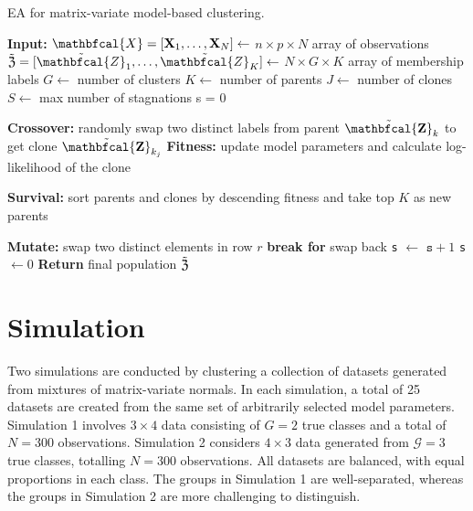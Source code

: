 \documentclass[12pt, centerh1]{article}
\begin{document}
\begin{algorithm}[h!]
\caption{EA for matrix-variate model-based clustering.}
\begin{algorithmic}[1]
	\Statex \textbf{Input:}
     		\Statex $ {\mathbfcal{X}} = [{\bf X}_1, \dots, {\bf X}_N ]\gets$ $n \times p \times N$ array of observations
		\Statex $ \tilde{ {\bf \mathfrak{Z} }} = [\tilde{ {\mathbfcal{Z}}}_{1}, \dots, \tilde{ {\mathbfcal{Z}}}_{K}]  \gets$ $N \times G \times K$ array of membership labels 
		 \Statex $G \gets$ number of clusters
   		 \Statex $K \gets$ number of parents
    		 \Statex $J \gets$ number of clones
    		 \Statex $S \gets$ max number of stagnations
\State s = 0

	 
		        \State \textbf{Crossover:} randomly swap two distinct labels from parent $\tilde{ {\bf \mathbfcal{Z}}}_{k}$ to get clone $\tilde{{\bf  \mathbfcal{Z}}}_{k_j}$
       			 \State \textbf{Fitness:} update model parameters and calculate log-likelihood of the clone 
		\EndFor
	\EndFor
	
	\State \textbf{Survival:} sort parents and clones by descending fitness and take top $K$ as new parents 
		
	 
        			\State \textbf{Mutate:} swap two distinct elements in row $r$ 
        				\State \textbf{break for}
     			\Else
     				\State swap back 
   			 \EndIf
        		\EndFor
        \EndFor  
        \State \texttt{s} $\gets$  $\texttt{s}  + 1$
        \Else
        \State \texttt{s} $\gets 0$ 
    \EndIf
\EndWhile
\Statex \textbf{Return} final population $\tilde{ {\bf \mathfrak{Z} }}$
\end{algorithmic}
\end{algorithm}


\newpage


\section{Simulation}
Two simulations are conducted by clustering a collection of datasets generated from mixtures of matrix-variate normals. In each simulation, a total of 25 datasets are created from the same set of arbitrarily selected model parameters. Simulation 1 involves $3 \times 4$ data consisting of $G = 2$ true classes and a total of $N=300$ observations. Simulation 2 considers $4 \times 3$ data generated from $\mathcal{G} = 3$ true classes, totalling $N= 300$ observations. All datasets are balanced, with equal proportions in each class. The groups in Simulation 1 are well-separated, whereas the groups in Simulation 2 are more challenging to distinguish. 
\end{document}
